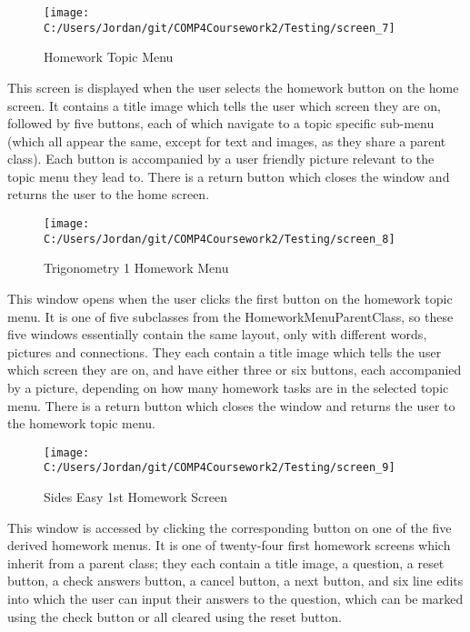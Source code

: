 \begin{figure}[H]
    \label{fig: Second Screen}\caption{Homework Topic Menu}
    \texttt{[image: C:/Users/Jordan/git/COMP4Coursework2/Testing/screen\_7]}
\end{figure}

This screen is displayed when the user selects the homework button on the home screen. It contains a title image which tells the user which screen they are on, followed by five buttons, each of which navigate to a topic specific sub-menu (which all appear the same, except for text and images, as they share a parent class). Each button is accompanied by a user friendly picture relevant to the topic menu they lead to. There is a return button which closes the window and returns the user to the home screen.

\begin{figure}[H]
    \label{fig: Second Screen}\caption{Trigonometry 1 Homework Menu}
    \texttt{[image: C:/Users/Jordan/git/COMP4Coursework2/Testing/screen\_8]}
\end{figure}

This window opens when the user clicks the first button on the homework topic menu. It is one of five subclasses from the HomeworkMenuParentClass, so these five windows essentially contain the same layout, only with different words, pictures and connections. They each contain a title image which tells the user which screen they are on, and have either three or six buttons, each accompanied by a picture, depending on how many homework tasks are in the selected topic menu. There is a return button which closes the window and returns the user to the homework topic menu.

\begin{figure}[H]
    \label{fig: Second Screen}\caption{Sides Easy 1st Homework Screen}
    \texttt{[image: C:/Users/Jordan/git/COMP4Coursework2/Testing/screen\_9]}
\end{figure}

This window is accessed by clicking the corresponding button on one of the five derived homework menus. It is one of twenty-four first homework screens which inherit from a parent class; they each contain a title image, a question, a reset button, a check answers button, a cancel button, a next button, and six line edits into which the user can input their answers to the question, which can be marked using the check button or all cleared using the reset button. 

